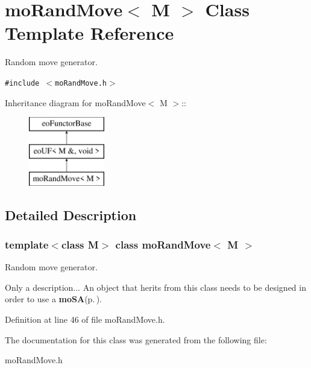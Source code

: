\section{mo\-Rand\-Move$<$ M $>$ Class Template Reference}
\label{classmo_rand_move}
Random move generator.  


{\tt \#include $<$mo\-Rand\-Move.h$>$}

Inheritance diagram for mo\-Rand\-Move$<$ M $>$::\begin{figure}[H]
\begin{center}
\leavevmode
\includegraphics[height=3cm]{classmo_rand_move}
\end{center}
\end{figure}


\subsection{Detailed Description}
\subsubsection*{template$<$class M$>$ class mo\-Rand\-Move$<$ M $>$}

Random move generator. 

Only a description... An object that herits from this class needs to be designed in order to use a {\bf mo\-SA}{\rm (p.\,\pageref{classmo_s_a})}. 



Definition at line 46 of file mo\-Rand\-Move.h.

The documentation for this class was generated from the following file:\begin{CompactItemize}
\item 
mo\-Rand\-Move.h\end{CompactItemize}
